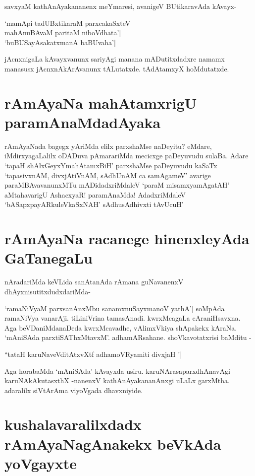 savxyaM kathAnAyakananenx meYmaresi, avanigeV BUtikaravAda kAvayx-

\begin{shloka}
`mamApi tadUBxtikaraM parxcakaSxteV\label{211d}\\
mahAnuBAvaM paritaM niboVdhata'|\\
`buBUSayAsakatxmanA baBUvaha'|\label{211c}
\end{shloka}
jAcnxnigaLa kAvayxvanunx sariyAgi manana mADutitxdadxre namamx manasusx jAcnxnAkArAvanunx tALutatxde. tAdAtamxyX hoMdutatxde.

\section*{rAmAyaNa mahAtamxrigU paramAnaMdadAyaka}

rAmAyaNada bagegx yAriMda elilx parxshaMse naDeyitu? eMdare, iMdirxyagaLalilx oDADuva pAmarariMda mecicxge paDeyuvudu sulaBa. Adare `tapaH shAlxGeyxYmahAtamxBiH'\label{211} parxshaMse paDeyuvudu kaSaTx `tapasivxnAM, divxjAtiVnAM, sAdhUnAM ca samAgameV' avarige paraMBAvavanunxMTu mADidadxriMdaleV `paraM misamxyamAgatAH'\label{211a} aMtahavarigU AshacxyaR! paramAnaMda! AdadxriMdaleV `bASapxpayARkuleVkaSxNAH'\label{211b} sAdhusAdhivxti tAvUcuH'\label{211g}

\section*{rAmAyaNa racanege hinenxleyAda GaTanegaLu}

nAradariMda keVLida sanAtanAda rAmana guNavanenxV dhAyxnisutitxdudxdariMda-

`ramaNiVyaM parxsanAnxMbu\label{211f} sanamxnuSayxmanoV yathA'| soMpAda ramaNiVya vanarAji. tiLiniVrina tamasAnadi. kwrxMcagaLa cAraniHsavxna. Aga beVDaniMdanaDeda kwrxMcavadhe, vAlimxVkiya shApakekx kAraNa. `mAniSAda parxtiSAThxMtavxM'. adhamARsahane. shoVkavotatxrisi baMditu -

\begin{shloka}
``tataH karuNaveVditAtxvXtf adhamoVR\s yamiti divxjaH '|\label{211i}
\end{shloka}

Aga horabaMda `mAniSAda' kAvayxda usiru. karuNArasaparxdhAnavAgi karuNAkAkutasxthX  -nanenxV kathAnAyakananAnxgi uLaLx garxMtha. adaralilx siVtArAma viyoVgada dhavxniyide.

\section*{kushalavaralilxdadx rAmAyaNagAnakekx beVkAda yoVgayxte}

